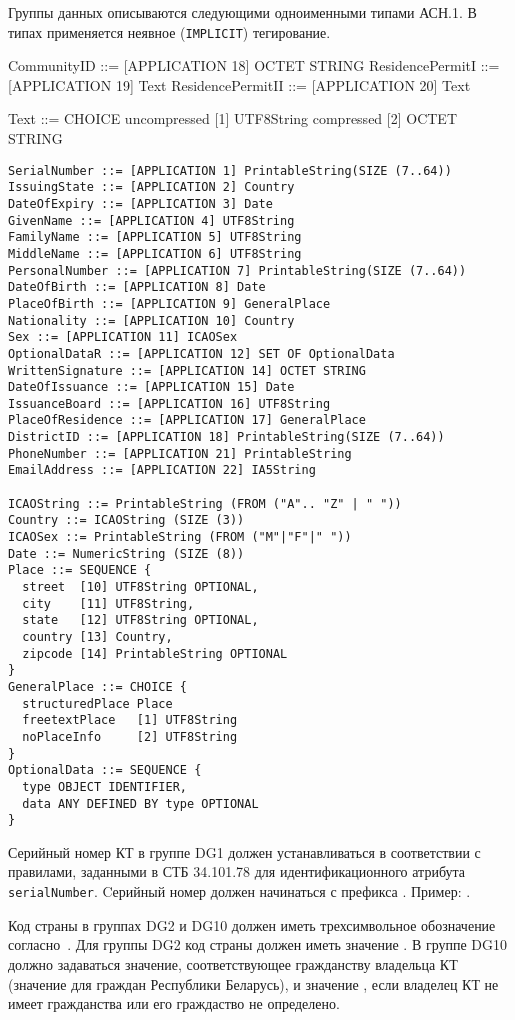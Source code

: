 Группы данных описываются следующими одноименными типами АСН.1.
В типах применяется неявное (\texttt{IMPLICIT}) тегирование.

CommunityID ::= [APPLICATION 18] OCTET STRING
ResidencePermitI ::= [APPLICATION 19] Text
ResidencePermitII ::= [APPLICATION 20] Text

Text ::= CHOICE {
  uncompressed [1] UTF8String
  compressed   [2] OCTET STRING
}
\fi


\begin{verbatim}
SerialNumber ::= [APPLICATION 1] PrintableString(SIZE (7..64))
IssuingState ::= [APPLICATION 2] Country
DateOfExpiry ::= [APPLICATION 3] Date
GivenName ::= [APPLICATION 4] UTF8String
FamilyName ::= [APPLICATION 5] UTF8String
MiddleName ::= [APPLICATION 6] UTF8String
PersonalNumber ::= [APPLICATION 7] PrintableString(SIZE (7..64))
DateOfBirth ::= [APPLICATION 8] Date
PlaceOfBirth ::= [APPLICATION 9] GeneralPlace
Nationality ::= [APPLICATION 10] Country
Sex ::= [APPLICATION 11] ICAOSex
OptionalDataR ::= [APPLICATION 12] SET OF OptionalData
WrittenSignature ::= [APPLICATION 14] OCTET STRING
DateOfIssuance ::= [APPLICATION 15] Date
IssuanceBoard ::= [APPLICATION 16] UTF8String
PlaceOfResidence ::= [APPLICATION 17] GeneralPlace
DistrictID ::= [APPLICATION 18] PrintableString(SIZE (7..64))
PhoneNumber ::= [APPLICATION 21] PrintableString
EmailAddress ::= [APPLICATION 22] IA5String

ICAOString ::= PrintableString (FROM ("A".. "Z" | " "))
Country ::= ICAOString (SIZE (3))
ICAOSex ::= PrintableString (FROM ("M"|"F"|" "))
Date ::= NumericString (SIZE (8))
Place ::= SEQUENCE {
  street  [10] UTF8String OPTIONAL,
  city    [11] UTF8String,
  state   [12] UTF8String OPTIONAL,
  country [13] Country,
  zipcode [14] PrintableString OPTIONAL
}
GeneralPlace ::= CHOICE {
  structuredPlace Place
  freetextPlace   [1] UTF8String
  noPlaceInfo     [2] UTF8String
}
OptionalData ::= SEQUENCE {
  type OBJECT IDENTIFIER,
  data ANY DEFINED BY type OPTIONAL
}
\end{verbatim}

Серийный номер КТ в группе DG1 должен устанавливаться в соответствии с правилами,
заданными в СТБ 34.101.78 для идентификационного атрибута \verb|serialNumber|. 
Cерийный номер должен начинаться с префикса .
Пример: .

Код страны в группах DG2 и DG10 должен иметь трехсимвольное обозначение 
согласно~\cite{CountryCodes}. 
Для группы DG2 код страны должен иметь значение .
В группе DG10 должно задаваться значение, соответствующее
гражданству владельца КТ (значение  для граждан Республики Беларусь), 
и значение , если владелец КТ не имеет гражданства 
или его граждаство не определено.


